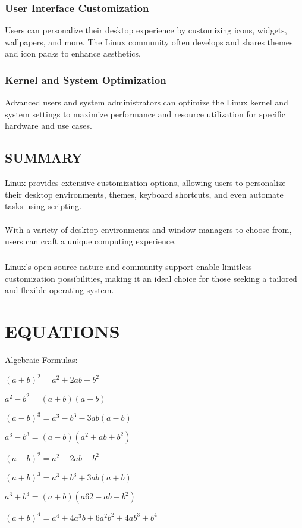 \documentclass{article}
\begin{document}
\subsubsection{User Interface Customization}
Users can personalize their desktop experience by customizing icons, widgets, wallpapers, and more. The Linux community often develops and shares themes and icon packs to enhance aesthetics.

\subsubsection{Kernel and System Optimization}
Advanced users and system administrators can optimize the Linux kernel and system settings to maximize performance and resource utilization for specific hardware and use cases.


\subsection{SUMMARY}
Linux provides extensive customization options, allowing users to personalize their desktop environments, themes, keyboard shortcuts, and even automate tasks using scripting.
\paragraph{}
With a variety of desktop environments and window managers to choose from, users can craft a unique computing experience.
\subparagraph{}
Linux's open-source nature and community support enable limitless customization possibilities, making it an ideal choice for those seeking a tailored and flexible operating system.
\newpage

\section{EQUATIONS}
Algebraic Formulas:

$ (a+b)^2 = a^2 + 2ab + b^2 $

$ a^2 - b^2 = (a+b)(a-b) $

$ (a-b)^3 = a^3 - b^3 -3ab(a-b) $

$ a^3-b^3 =  (a-b)(a^2+ab+b^2) $

$ (a-b)^2 = a^2 - 2ab + b^2 $

$ (a+b)^3 = a^3 + b^3 + 3ab(a+b) $

$ a^3 + b^3 = (a+b)(a62-ab+b^2) $

$(a + b)^4 = a^4 + 4a^3b + 6a^2b^2 + 4ab^3 + b^4$
\end{document}
